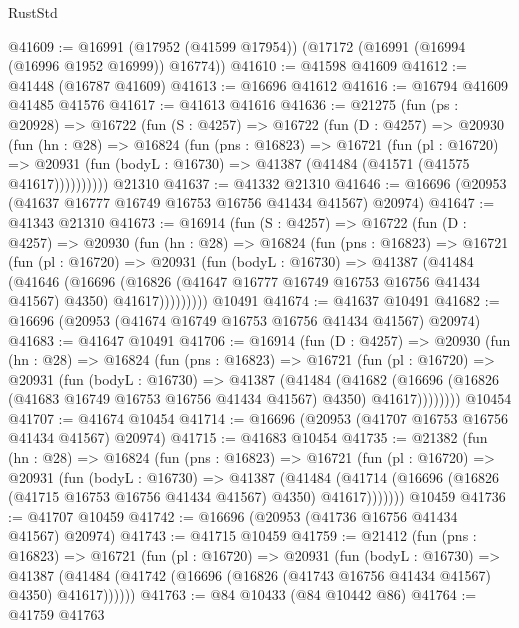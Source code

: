 \begin{lexlean}{RustStd}
\begin{coremodule}
@41609 := @16991 (@17952 (@41599 @17954)) (@17172 (@16991 (@16994 (@16996 @1952 @16999)) @16774))
@41610 := @41598 @41609
@41612 := @41448 (@16787 @41609)
@41613 := @16696 @41612
@41616 := @16794 @41609 @41485 @41576
@41617 := @41613 @41616
@41636 := @21275
    (fun (ps : @20928) =>
    @16722
      (fun (S : @4257) =>
      @16722
        (fun (D : @4257) =>
        @20930
          (fun (hn : @28) =>
          @16824
            (fun (pns : @16823) =>
            @16721
              (fun (pl : @16720) =>
              @20931 (fun (bodyL : @16730) => @41387 (@41484 (@41571 (@41575 @41617))))))))))
    @21310
@41637 := @41332 @21310
@41646 := @16696 (@20953 (@41637 @16777 @16749 @16753 @16756 @41434 @41567) @20974)
@41647 := @41343 @21310
@41673 := @16914
    (fun (S : @4257) =>
    @16722
      (fun (D : @4257) =>
      @20930
        (fun (hn : @28) =>
        @16824
          (fun (pns : @16823) =>
          @16721
            (fun (pl : @16720) =>
            @20931
              (fun (bodyL : @16730) =>
              @41387
                (@41484
                  (@41646
                    (@16696
                      (@16826 (@41647 @16777 @16749 @16753 @16756 @41434 @41567) @4350)
                      @41617)))))))))
    @10491
@41674 := @41637 @10491
@41682 := @16696 (@20953 (@41674 @16749 @16753 @16756 @41434 @41567) @20974)
@41683 := @41647 @10491
@41706 := @16914
    (fun (D : @4257) =>
    @20930
      (fun (hn : @28) =>
      @16824
        (fun (pns : @16823) =>
        @16721
          (fun (pl : @16720) =>
          @20931
            (fun (bodyL : @16730) =>
            @41387
              (@41484
                (@41682
                  (@16696 (@16826 (@41683 @16749 @16753 @16756 @41434 @41567) @4350) @41617))))))))
    @10454
@41707 := @41674 @10454
@41714 := @16696 (@20953 (@41707 @16753 @16756 @41434 @41567) @20974)
@41715 := @41683 @10454
@41735 := @21382
    (fun (hn : @28) =>
    @16824
      (fun (pns : @16823) =>
      @16721
        (fun (pl : @16720) =>
        @20931
          (fun (bodyL : @16730) =>
          @41387
            (@41484
              (@41714 (@16696 (@16826 (@41715 @16753 @16756 @41434 @41567) @4350) @41617)))))))
    @10459
@41736 := @41707 @10459
@41742 := @16696 (@20953 (@41736 @16756 @41434 @41567) @20974)
@41743 := @41715 @10459
@41759 := @21412
    (fun (pns : @16823) =>
    @16721
      (fun (pl : @16720) =>
      @20931
        (fun (bodyL : @16730) =>
        @41387 (@41484 (@41742 (@16696 (@16826 (@41743 @16756 @41434 @41567) @4350) @41617))))))
@41763 := @84 @10433 (@84 @10442 @86)
@41764 := @41759 @41763

\end{coremodule}
\end{lexlean}

